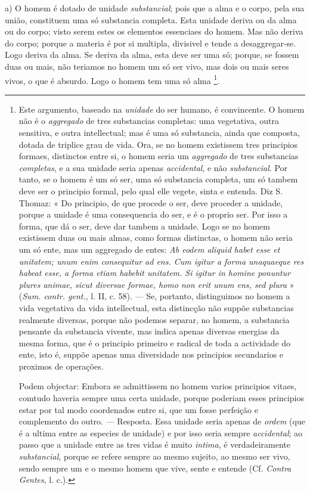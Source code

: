 a) O homem é dotado de unidade \emph{substancial}; pois que a alma e o corpo, pela sua união, constituem uma só substancia completa. Esta unidade deriva ou da alma ou do corpo; visto serem estes os elementos essenciaes do homem. Mas não deriva do corpo; porque a materia é por si multipla, divisivel e tende a desaggregar-se. Logo deriva da alma. Se deriva da alma, esta deve ser uma só; porque, se fossem duas ou mais,  não teriamos no homem um só ser vivo, mas dois ou mais seres vivos, o que é absurdo. Logo o homem tem uma só alma \footnote{Este argumento, baseado na \emph{unidade} do ser humano, é convincente. O homem não é o \emph{aggregado} de tres substancias completas: uma vegetativa, outra sensitiva, e outra intellectual; mas é uma só substancia, ainda que composta, dotada de triplice grau de vida. Ora, se no homem existissem tres principios formaes, distinctos entre si, o homem seria um \emph{aggregado} de tres substancias \emph{completas}, e a sua unidade seria apenas \emph{accidental}, e não \emph{substancial}. Por tanto, se o homem é um só ser, uma só substancia completa, um só tambem deve ser o principio formal, pelo qual elle vegete, sinta e entenda. Diz S. Thomaz: « Do principio, de que procede o ser, deve proceder a unidade, porque a unidade é uma consequencia do ser, e é o proprio ser. Por isso a forma, que dá o ser, deve dar tambem a unidade. Logo se no homem existissem duas ou mais almas, como formas distinctas, o homem não seria um só ente, mas um aggregado de entes: \emph{Ab eodem aliquid habet esse et unitatem; unum enim consequitur ad ens. Cum igitur a forma unaquaeque res habeat esse, a forma etiam habebit unitatem. Si igitur in homine ponuntur plures animae, sicut diversae formae, homo non erit unum ens, sed plura} » (\emph{Sum. contr. gent.}, l. II, c. 58). --- Se, portanto, distinguimos no homem a vida vegetativa da vida intellectual, esta distincção não suppõe substancias realmente diversas, porque não podemos separar, no homem, a substancia pensante da substancia vivente, mas indica apenas diversas energias da mesma forma, que é o principio primeiro e radical de toda a actividade do ente, isto é, suppõe apenas uma diversidade nos principios secundarios e proximos de operações.\par Podem objectar: Embora se admittissem no homem varios principios vitaes, comtudo haveria sempre uma certa unidade, porque poderiam esses principios estar por tal modo coordenados entre si, que um fosse perfeição e complemento do outro. --- Resposta. Essa unidade seria apenas de \emph{ordem} (que é a ultima entre as especies de unidade) e por isso seria sempre \emph{accidental}; ao passo que a unidade entre as tres vidas é muito \emph{intima}, é verdadeiramente \emph{substancial}, porque se refere sempre ao mesmo sujeito, ao mesmo ser vivo, sendo sempre um e o mesmo homem que vive, sente e entende (Cf. \emph{Contra Gentes}, l. c.).}.

